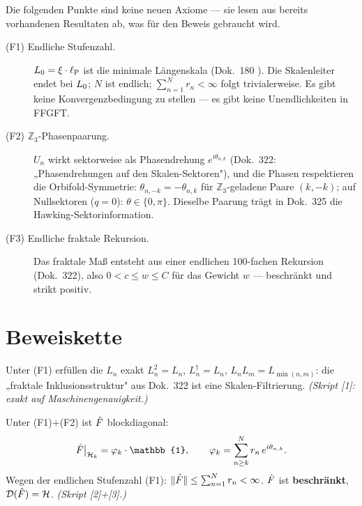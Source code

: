 Die folgenden Punkte sind keine neuen Axiome — sie lesen aus
bereits vorhandenen Resultaten ab, was für den Beweis gebraucht wird.

\begin{description}
  \item[(F1) Endliche Stufenzahl.]
    $L_0 = \xi\cdot\ell_{\mathrm{P}}$ ist die minimale Längenskala (Dok.~180 \K).
    Die Skalenleiter endet bei $L_0$; $N$ ist endlich;
    $\sum_{n=1}^N r_n < \infty$ folgt trivialerweise.
    Es gibt keine Konvergenzbedingung zu stellen —
    es gibt keine Unendlichkeiten in FFGFT.

  \item[(F2) $\mathbb{Z}_3$-Phasenpaarung.]
    $U_n$ wirkt sektorweise als Phasendrehung $e^{i\theta_{n,k}}$
    (Dok.~322: „Phasendrehungen auf den Skalen-Sektoren"),
    und die Phasen respektieren die Orbifold-Symmetrie:
    $\theta_{n,-k} = -\theta_{n,k}$ für $\mathbb{Z}_3$-geladene Paare $(k,-k)$;
    auf Nullsektoren ($q=0$): $\theta \in \{0,\pi\}$.
    Dieselbe Paarung trägt in Dok.~325 die Hawking-Sektorinformation.

  \item[(F3) Endliche fraktale Rekursion.]
    Das fraktale Maß entsteht aus einer endlichen 100-fachen Rekursion
    (Dok.~322), also $0 < c \le w \le C$ für das Gewicht $w$ — beschränkt
    und strikt positiv.
\end{description}

\section{Beweiskette}

\begin{tcolorbox}[proofbox, title={Lemma 1 — Filtrierung realisiert die Dok.-322-Axiome \B}]
  Unter (F1) erfüllen die $L_n$ exakt $L_n^2 = L_n$, $L_n^\dagger = L_n$,
  $L_nL_m = L_{\min(n,m)}$: die „fraktale Inklusionsstruktur" aus Dok.~322
  ist eine Skalen-Filtrierung.
  \emph{(Skript [1]: exakt auf Maschinengenauigkeit.)}
\end{tcolorbox}

\begin{tcolorbox}[proofbox, title={Satz 2 — Diagonalform und Beschränktheit \B}]
  Unter (F1)+(F2) ist $\hat{F}$ blockdiagonal:
  \[
    \Fhat\big|_{\Hcal_k} = \varphi_k \cdot \mathbb{1},
    \qquad
    \varphi_k = \sum_{n \ge k}^{N} r_n\, e^{i\theta_{n,k}}.
  \]
  Wegen der endlichen Stufenzahl (F1):
  $\|\hat{F}\| \le \sum_{n=1}^{N} r_n < \infty$.
  $\hat{F}$ ist \textbf{beschränkt}, $\mathcal{D}(\hat{F}) = \mathcal{H}$.
  \emph{(Skript [2]+[3].)}
\end{tcolorbox}

